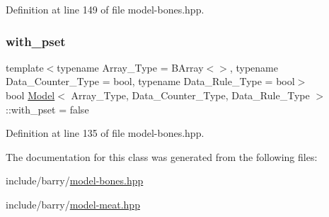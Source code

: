 Definition at line 149 of file model-\/bones.\+hpp.

\mbox{\label{class_model_afd37924e6fcfdc30c9fc5ad56f1c4947}} 
\subsubsection{\texorpdfstring{with\+\_\+pset}{with\_pset}}
{\footnotesize\ttfamily template$<$typename Array\+\_\+\+Type = B\+Array$<$$>$, typename Data\+\_\+\+Counter\+\_\+\+Type = bool, typename Data\+\_\+\+Rule\+\_\+\+Type = bool$>$ \\
bool \hyperlink{class_model}{Model}$<$ Array\+\_\+\+Type, Data\+\_\+\+Counter\+\_\+\+Type, Data\+\_\+\+Rule\+\_\+\+Type $>$\+::with\+\_\+pset = false}



Definition at line 135 of file model-\/bones.\+hpp.



The documentation for this class was generated from the following files\+:\begin{DoxyCompactItemize}
\item 
include/barry/\hyperlink{model-bones_8hpp}{model-\/bones.\+hpp}\item 
include/barry/\hyperlink{model-meat_8hpp}{model-\/meat.\+hpp}\end{DoxyCompactItemize}
